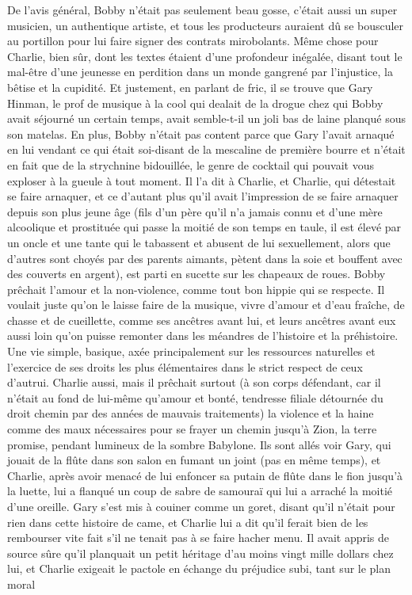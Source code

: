 De l’avis général, Bobby n’était pas seulement beau gosse, c’était aussi un super musicien, un authentique artiste, et tous les producteurs auraient dû se bousculer au portillon pour lui faire signer des contrats mirobolants. Même chose pour Charlie, bien sûr, dont les textes étaient d’une profondeur inégalée, disant tout le mal-être d’une jeunesse en perdition dans un monde gangrené par l’injustice, la bêtise et la cupidité. Et justement, en parlant de fric, il se trouve que Gary Hinman, le prof de musique à la cool qui dealait de la drogue chez qui Bobby avait séjourné un certain temps, avait semble-t-il un joli bas de laine planqué sous son matelas. En plus, Bobby n’était pas content parce que Gary l’avait arnaqué en lui vendant ce qui était soi-disant de la mescaline de première bourre et n’était en fait que de la strychnine bidouillée, le genre de cocktail qui pouvait vous exploser à la gueule à tout moment. Il l’a dit à Charlie, et Charlie, qui détestait se faire arnaquer, et ce d’autant plus qu’il avait l’impression de se faire arnaquer depuis son plus jeune âge (fils d’un père qu’il n’a jamais connu et d’une mère alcoolique et prostituée qui passe la moitié de son temps en taule, il est élevé par un oncle et une tante qui le tabassent et abusent de lui sexuellement, alors que d’autres sont choyés par des parents aimants, pètent dans la soie et bouffent avec des couverts en argent), est parti en sucette sur les chapeaux de roues. Bobby prêchait l’amour et la non-violence, comme tout bon hippie qui se respecte. Il voulait juste qu’on le laisse faire de la musique, vivre d’amour et d’eau fraîche, de chasse et de cueillette, comme ses ancêtres avant lui, et leurs ancêtres avant eux aussi loin qu’on puisse remonter dans les méandres de l’histoire et la préhistoire. Une vie simple, basique, axée principalement sur les ressources naturelles et l’exercice de ses droits les plus élémentaires dans le strict respect de ceux d’autrui. Charlie aussi, mais il prêchait surtout (à son corps défendant, car il n’était au fond de lui-même qu’amour et bonté, tendresse filiale détournée du droit chemin par des années de mauvais traitements) la violence et la haine comme des maux nécessaires pour se frayer un chemin jusqu’à Zion, la terre promise, pendant lumineux de la sombre Babylone. Ils sont allés voir Gary, qui jouait de la flûte dans son salon en fumant un joint (pas en même temps), et Charlie, après avoir menacé de lui enfoncer sa putain de flûte dans le fion jusqu’à la luette, lui a flanqué un coup de sabre de samouraï qui lui a arraché la moitié d’une oreille. Gary s’est mis à couiner comme un goret, disant qu’il n’était pour rien dans cette histoire de came, et Charlie lui a dit qu’il ferait bien de les rembourser vite fait s’il ne tenait pas à se faire hacher menu. Il avait appris de source sûre qu’il planquait un petit héritage d’au moins vingt mille dollars chez lui, et Charlie exigeait le pactole en échange du préjudice subi, tant sur le plan moral 